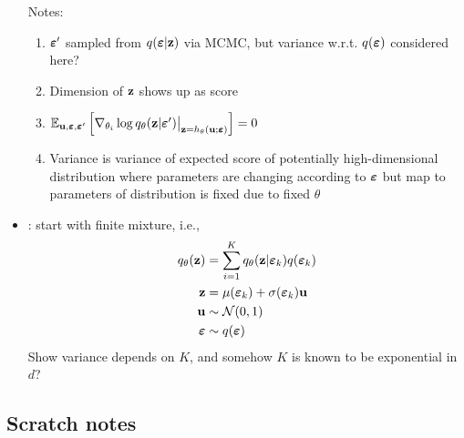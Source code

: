 \documentclass[10pt]{article}
\begin{document}
\begin{itemize}
Notes:
\begin{enumerate}
\item
$\bm{\varepsilon}'$ sampled from $q(\bm{\varepsilon}|\mathbf{z})$ via MCMC, but variance w.r.t. $q(\bm{\varepsilon})$ considered here?
\item
Dimension of $\mathbf{z}$ shows up as score
\item
$\mathbb{E}_{\mathbf{u},\bm{\varepsilon},\bm{\varepsilon}'}\left[\nabla_{\theta_i}\log q_\theta(\mathbf{z}|\bm{\varepsilon}')\big|_{\mathbf{z}=h_\theta(\mathbf{u};\bm{\varepsilon})}\right]=0$
\item
Variance is variance of expected score of potentially high-dimensional distribution where parameters are changing according to $\bm{\varepsilon}$ but map to parameters of distribution is fixed due to fixed $\theta$
\end{enumerate}

\item
\todo: start with finite mixture, i.e.,
\begin{align*}
q_\theta(\mathbf{z}) &= \sum_{i=1}^Kq_\theta(\mathbf{z}|\bm{\varepsilon}_k)q(\bm{\varepsilon}_k) \\
\mathbf{z} &= \mu(\bm{\varepsilon}_k) + \sigma(\bm{\varepsilon}_k)\mathbf{u} \\
\mathbf{u} &\sim \mathcal{N}(0,1) \\
\bm{\varepsilon} &\sim q(\bm{\varepsilon})
\end{align*}
Show variance depends on $K$, and somehow $K$ is known to be exponential in $d$?

\iffalse
\item
If mixing distribution is discrete, we may have label-switching problems, particularly with \mcmc? \citep{Chung:2004}

Example: $q(\bfeps)=\mathrm{Bernoulli}(0.5)$. Then in normal reparameterization, we end up with parameters $\{\mu_1,\Sigma_1\}$, $\{\mu_2,\Sigma_2\}$. Can we estimate these following \elbo gradient or do we get degeneracy somehow?
\fi

\end{itemize}


\subsection{Scratch notes}
\end{document}
